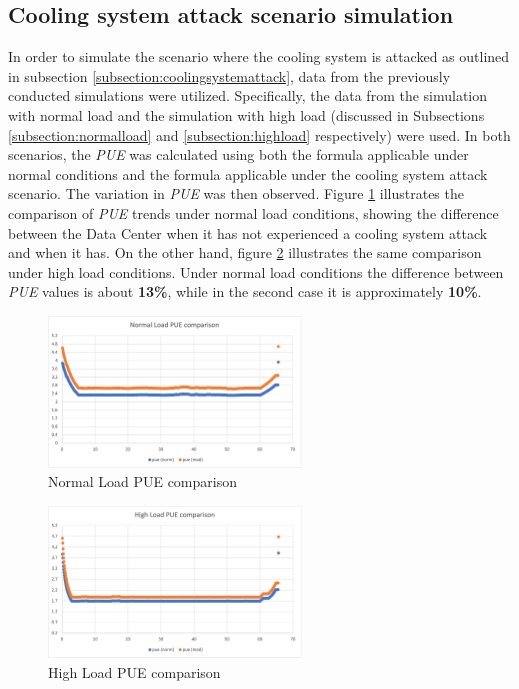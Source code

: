\subsection{Cooling system attack scenario simulation}
In order to simulate the scenario where the cooling system is attacked as outlined in subsection \ref{subsection:coolingsystemattack}, data from the previously conducted simulations were utilized. Specifically, the data from the simulation with normal load and the simulation with high load (discussed in Subsections \ref{subsection:normalload} and \ref{subsection:highload} respectively) were used. In both scenarios, the \emph{PUE} was calculated using both the formula applicable under normal conditions and the formula applicable under the cooling system attack scenario. The variation in \emph{PUE} was then observed. Figure \ref{fig:normal_load_pue_comp} illustrates the comparison of \emph{PUE} trends under normal load conditions, showing the difference between the Data Center when it has not experienced a cooling system attack and when it has. On the other hand, figure \ref{fig:high_load_pue_comp} illustrates the same comparison under high load conditions. Under normal load conditions the difference between \emph{PUE} values is about \textbf{13\%}, while in the second case it is approximately \textbf{10\%}.
\begin{figure}[h]
    \centering
    \includegraphics[width=0.6\textwidth]{chapters/images/normal_load_pue_comp.png}
    \caption{Normal Load PUE comparison}
    \label{fig:normal_load_pue_comp}
\end{figure}

\begin{figure}[h]
    \centering
    \includegraphics[width=0.6\textwidth]{chapters/images/high_load_pue_comp.png}
    \caption{High Load PUE comparison}
    \label{fig:high_load_pue_comp}
\end{figure}


